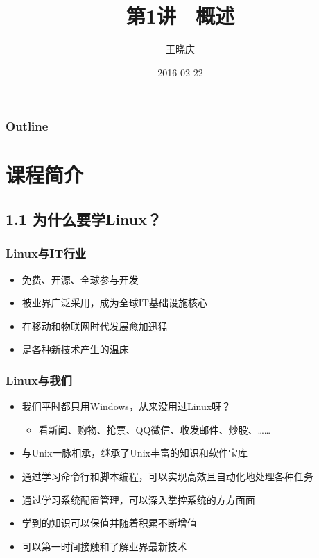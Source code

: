 \documentclass[xcolor=svgnames,bigger,presentation]{beamer}
\title{第1讲　概述}
\author{王晓庆}
\date{2016-02-22}
\institute{wangxiaoqing@outlook.com}
\begin{document}
\maketitle

\begin{frame}
\frametitle{Outline}
\setcounter{tocdepth}{1}
\tableofcontents
\end{frame}

\section{课程简介}
\label{sec-1}
\subsection{1.1 为什么要学Linux？}
\label{sec-1-1}
\begin{frame}
\frametitle{Linux与IT行业}
\label{sec-1-1-1}
\begin{itemize}

\item 免费、开源、全球参与开发
\label{sec-1-1-1-1}%

\item 被业界广泛采用，成为全球IT基础设施核心
\label{sec-1-1-1-2}%

\item 在移动和物联网时代发展愈加迅猛
\label{sec-1-1-1-3}%

\item 是各种新技术产生的温床
\label{sec-1-1-1-4}%
\end{itemize} %
\end{frame}
\begin{frame}
\frametitle{Linux与我们}
\label{sec-1-1-2}
\begin{itemize}

\item 我们平时都只用Windows，从来没用过Linux呀？
\label{sec-1-1-2-1}%
\begin{itemize}

\item 看新闻、购物、抢票、QQ微信、收发邮件、炒股、……
\label{sec-1-1-2-1-1}%
\end{itemize} %

\item 与Unix一脉相承，继承了Unix丰富的知识和软件宝库
\label{sec-1-1-2-2}%

\item 通过学习命令行和脚本编程，可以实现高效且自动化地处理各种任务
\label{sec-1-1-2-3}%

\item 通过学习系统配置管理，可以深入掌控系统的方方面面
\label{sec-1-1-2-4}%

\item 学到的知识可以保值并随着积累不断增值
\label{sec-1-1-2-5}%

\item 可以第一时间接触和了解业界最新技术
\label{sec-1-1-2-6}%
\end{itemize} %
\end{frame}
\end{document}
